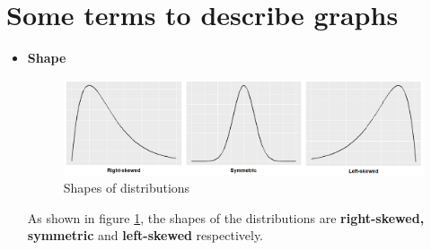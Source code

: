 \documentclass[a4paper, 12pt,twoside]{book}
\begin{document}
\section{Some terms to describe graphs}
\begin{itemize}
\item \textbf{Shape}
\begin{figure}[H]
\centering
\includegraphics[scale=0.35]{Skewness.png}
\caption{Shapes of distributions}
\label{Skewness}
\end{figure}
As shown in figure \ref{Skewness}, the shapes of the distributions are \textbf{right-skewed, symmetric} and \textbf{left-skewed} respectively.


\end{itemize}
\end{document}
